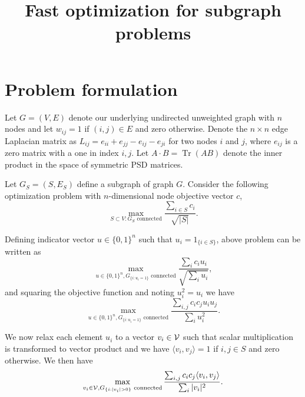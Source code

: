 \documentclass{article}
\DeclareMathOperator{\Tr}{Tr}
\begin{document}
\title{Fast optimization for subgraph problems}
\author{\vspace{-10pt}}

\maketitle

\section{Problem formulation}

Let $G = (V,E)$ denote our underlying undirected unweighted graph with $n$ nodes and let $w_{ij} = 1$ if $(i,j) \in E$ and zero otherwise. Denote the $n \times n$ edge Laplacian matrix as $L_{ij} = e_{ii} + e_{jj} - e_{ij} - e_{ji}$ for two nodes $i$ and $j$, where $e_{ij}$ is a zero matrix with a one in index $i,j$. Let $A \cdot B = \Tr(A B)$ denote the inner product in the space of symmetric PSD matrices. 

Let $G_S = (S, E_S)$ define a subgraph of graph $G$. Consider the following optimization problem with $n$-dimensional node objective vector $c$,
\begin{equation}\label{eq:original_S}
  \max_{S \subset V: G_S \text{ connected}} \frac{\sum_{i \in S} c_i}{\sqrt{|S|}}.
\end{equation}

Defining indicator vector $u \in \{0,1\}^n$ such that $u_i = 1_{\{i \in S\}}$, above problem can be written as
\begin{equation}\label{eq:original_u}
  \max_{u \in \{0,1\}^n, G_{\{i: u_i = 1\}} \text{ connected}} \frac{\sum_{i} c_i u_i}{\sqrt{\sum_i u_i}},
\end{equation}
and squaring the objective function and noting $u_i^2 = u_i$ we have
\begin{equation}\label{eq:original_u2}
  \max_{u \in \{0,1\}^n, G_{\{i: u_i = 1\}} \text{ connected}} \frac{\sum_{i,j} c_i c_j u_i u_j}{\sum_i u_i^2}.
\end{equation}

We now relax each element $u_i$ to a vector $v_i \in {\cal V}$ such that scalar multiplication is transformed to vector product and we have $\langle v_i, v_j \rangle = 1$ if $i,j \in S$ and zero otherwise. We then have
\begin{equation}\label{eq:original_v}
  \max_{v_i \in {\cal V}, G_{\{i: |v_i| > 0\}} \text{ connected}} \frac{\sum_{i,j} c_i c_j \langle v_i, v_j \rangle}{\sum_i |v_i|^2}.
\end{equation}
\end{document}
